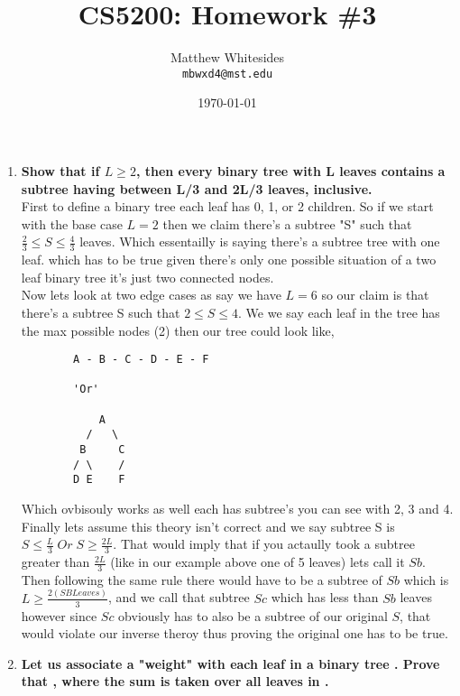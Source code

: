 \documentclass{article}
\title{CS5200: Homework \#3} %
\author{Matthew Whitesides\\ \texttt{mbwxd4@mst.edu}} %
\date{\today} %
\begin{document}
  \maketitle %
 
  \begin{enumerate}
    \item \textbf{Show that if $L \geq 2$, then every binary tree with L leaves contains a subtree having between L/3 and 2L/3 leaves, inclusive.} \\
    
      First to define a binary tree each leaf has 0, 1, or 2 children. So if we start with the base case $L = 2$ then we claim there's a subtree "S" such that $\frac{2}{3} \leq S \leq \frac{4}{3}$ leaves. 
      Which essentailly is saying there's a subtree tree with one leaf. which has to be true given there's only one possible situation of a two leaf binary tree it's just two connected nodes. \\

      Now lets look at two edge cases as say we have $L = 6$ so our claim is that there's a subtree S such that $2 \leq S \leq 4$. We we say each leaf in the tree has the max possible nodes (2) then our tree could look like, 
      \begin{lstlisting}
        A - B - C - D - E - F

        'Or'

            A
          /   \
         B     C
        / \    /
        D E    F
      \end{lstlisting}
      Which ovbisouly works as well each has subtree's you can see with 2, 3 and 4. \\

      Finally lets assume this theory isn't correct and we say subtree S is $S \leq \frac{L}{3}\;Or\;S \geq \frac{2L}{3}$. That would imply that if you actaully took a subtree greater than $\frac{2L}{3}$ (like in our example above one of 5 leaves) lets call it $Sb$.
      Then following the same rule there would have to be a subtree of $Sb$ which is $L \geq \frac{2(SB Leaves)}{3}$, and we call that subtree $Sc$ which has less than $Sb$ leaves however since $Sc$ obviously has to also be a subtree of our original $S$, that would violate our inverse theroy thus proving the original one has to be true.

      \item \textbf{Let us associate a "weight"  with each leaf in a binary tree . Prove that , where the sum is taken over all leaves  in .} \\
      

\end{enumerate}
\end{document}
